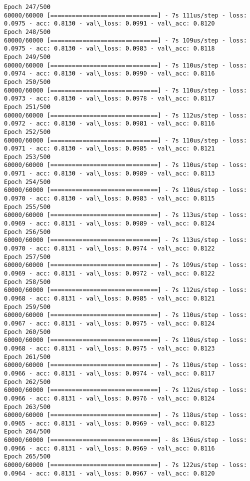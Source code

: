 \documentclass[11pt]{article}
\begin{document}
\begin{Verbatim}[commandchars=\\\{\}]
Epoch 247/500
60000/60000 [==============================] - 7s 111us/step - loss: 0.0975 - acc: 0.8130 - val\_loss: 0.0991 - val\_acc: 0.8120
Epoch 248/500
60000/60000 [==============================] - 7s 109us/step - loss: 0.0975 - acc: 0.8130 - val\_loss: 0.0983 - val\_acc: 0.8118
Epoch 249/500
60000/60000 [==============================] - 7s 110us/step - loss: 0.0974 - acc: 0.8130 - val\_loss: 0.0990 - val\_acc: 0.8116
Epoch 250/500
60000/60000 [==============================] - 7s 110us/step - loss: 0.0973 - acc: 0.8130 - val\_loss: 0.0978 - val\_acc: 0.8117
Epoch 251/500
60000/60000 [==============================] - 7s 112us/step - loss: 0.0972 - acc: 0.8130 - val\_loss: 0.0981 - val\_acc: 0.8116
Epoch 252/500
60000/60000 [==============================] - 7s 110us/step - loss: 0.0971 - acc: 0.8130 - val\_loss: 0.0985 - val\_acc: 0.8121
Epoch 253/500
60000/60000 [==============================] - 7s 110us/step - loss: 0.0971 - acc: 0.8130 - val\_loss: 0.0989 - val\_acc: 0.8113
Epoch 254/500
60000/60000 [==============================] - 7s 110us/step - loss: 0.0970 - acc: 0.8130 - val\_loss: 0.0983 - val\_acc: 0.8115
Epoch 255/500
60000/60000 [==============================] - 7s 113us/step - loss: 0.0969 - acc: 0.8131 - val\_loss: 0.0989 - val\_acc: 0.8124
Epoch 256/500
60000/60000 [==============================] - 7s 113us/step - loss: 0.0970 - acc: 0.8131 - val\_loss: 0.0974 - val\_acc: 0.8122
Epoch 257/500
60000/60000 [==============================] - 7s 109us/step - loss: 0.0969 - acc: 0.8131 - val\_loss: 0.0972 - val\_acc: 0.8122
Epoch 258/500
60000/60000 [==============================] - 7s 112us/step - loss: 0.0968 - acc: 0.8131 - val\_loss: 0.0985 - val\_acc: 0.8121
Epoch 259/500
60000/60000 [==============================] - 7s 110us/step - loss: 0.0967 - acc: 0.8131 - val\_loss: 0.0975 - val\_acc: 0.8124
Epoch 260/500
60000/60000 [==============================] - 7s 110us/step - loss: 0.0968 - acc: 0.8131 - val\_loss: 0.0975 - val\_acc: 0.8123
Epoch 261/500
60000/60000 [==============================] - 7s 110us/step - loss: 0.0966 - acc: 0.8131 - val\_loss: 0.0974 - val\_acc: 0.8117
Epoch 262/500
60000/60000 [==============================] - 7s 112us/step - loss: 0.0966 - acc: 0.8131 - val\_loss: 0.0976 - val\_acc: 0.8124
Epoch 263/500
60000/60000 [==============================] - 7s 118us/step - loss: 0.0965 - acc: 0.8131 - val\_loss: 0.0969 - val\_acc: 0.8123
Epoch 264/500
60000/60000 [==============================] - 8s 136us/step - loss: 0.0966 - acc: 0.8131 - val\_loss: 0.0969 - val\_acc: 0.8116
Epoch 265/500
60000/60000 [==============================] - 7s 122us/step - loss: 0.0964 - acc: 0.8131 - val\_loss: 0.0967 - val\_acc: 0.8120

\end{Verbatim}
\end{document}
